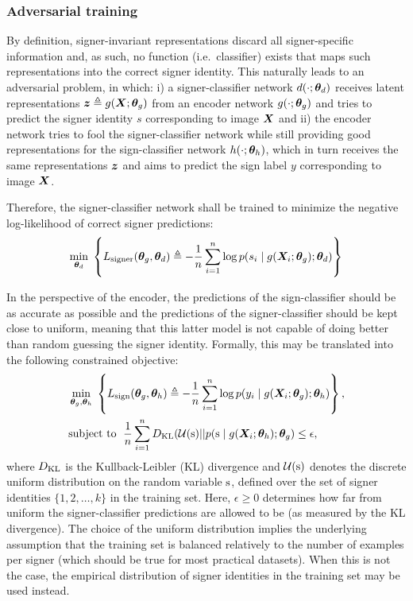 

\subsubsection{Adversarial training}
By definition, signer-invariant representations discard all signer-specific information and, as such, no function (i.e.\ classifier) exists that maps such representations into the correct signer identity. This naturally leads to an adversarial problem, in which: i) a signer-classifier network $d(\cdot; {\bm{\theta}}_d)$ receives latent representations ${\bm{z}} \triangleq g({\bm{X}};{\bm{\theta}}_g)$ from an encoder network $g(\cdot;{\bm{\theta}}_g)$ and tries to predict the signer identity $s$ corresponding to image ${\bm{X}}$ and ii) the encoder network tries to fool the signer-classifier network while still providing good representations for the sign-classifier network $h(\cdot; {\bm{\theta}}_h)$, which in turn receives the same representations ${\bm{z}}$ and aims to predict the sign label $y$ corresponding to image ${\bm{X}}$.

Therefore, the signer-classifier network shall be trained to minimize the negative log-likelihood of correct signer predictions:
\begin{equation}
\label{eq:signer_loss}
\min_{{\bm{\theta}}_d} \; \left\lbrace L_{\text{signer}}({\bm{\theta}}_g, {\bm{\theta}}_d) \triangleq -\frac{1}{n}\sum_{i=1}^n \log p(s_i \mid g({\bm{X}}_{i}; {\bm{\theta}}_g); {\bm{\theta}}_d) \right\rbrace
\end{equation}

In the perspective of the encoder, the predictions of the sign-classifier should be as accurate as possible and the predictions of the signer-classifier should be kept close to uniform, meaning that this latter model is not capable of doing better than random guessing the signer identity. Formally, this may be translated into the following constrained objective:
\begin{align}
\label{eq:sign_loss}
&\min_{{\bm{\theta}}_g, {\bm{\theta}}_h} \; \left\lbrace L_{\text{sign}}({\bm{\theta}}_g, {\bm{\theta}}_h)\triangleq-\frac{1}{n}\sum_{i=1}^n \log p(y_i \mid g({\bm{X}}_{i}; {\bm{\theta}}_g); {\bm{\theta}}_h)\right\rbrace,\\
\label{eq:kl_obj}
&\text{subject to } \; \frac{1}{n}\sum_{i=1}^n D_{\mathrm{KL}}({\mathcal{U}}({\textnormal{s}}) || p({\textnormal{s}} \mid g({\bm{X}}_{i}; {\bm{\theta}}_h); {\bm{\theta}}_g) \leq \epsilon,
\end{align}
where $D_{\mathrm{KL}}$ is the Kullback-Leibler (KL) divergence and ${\mathcal{U}}({\textnormal{s}})$ denotes the discrete uniform distribution on the random variable ${\textnormal{s}}$, defined over the set of signer identities $\{1, 2, \dots, k\}$ in the training set. Here, $\epsilon \geq 0$ determines how far from uniform the signer-classifier predictions are allowed to be (as measured by the KL divergence). The choice of the uniform distribution implies the underlying assumption that the training set is balanced relatively to the number of examples per signer (which should be true for most practical datasets). When this is not the case, the empirical distribution of signer identities in the training set may be used instead.

